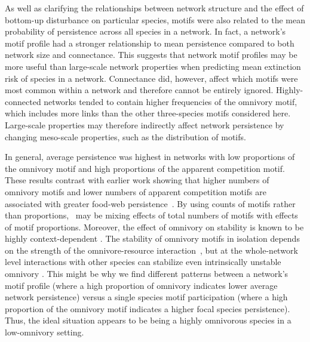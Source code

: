 \documentclass[12pt]{article}
\begin{document}
\begin{spacing}{2.0}
    As well as clarifying the relationships between network structure and the effect of bottom-up disturbance on particular species, motifs were also related to the mean probability of persistence across all species in a network.
    In fact, a network's motif profile had a stronger relationship to mean persistence compared to both network size and connectance. 
    This suggests that network motif profiles may be more useful than large-scale network properties when predicting mean extinction risk of species in a network.
    Connectance did, however, affect which motifs were most common within a network and therefore cannot be entirely ignored. 
    Highly-connected networks tended to contain higher frequencies of the omnivory motif, which includes more links than the other three-species motifs considered here.
    Large-scale properties may therefore indirectly affect network persistence by changing meso-scale properties, such as the distribution of motifs. 
    
    
    In general, average persistence was highest in networks with low proportions of the omnivory motif and high proportions of the apparent competition motif. 
    These results contrast with earlier work showing that higher numbers of omnivory motifs and lower numbers of apparent competition motifs are associated with greater food-web persistence~\citep{Stouffer2010b}.
    By using counts of motifs rather than proportions,~\citet{Stouffer2010b} may be mixing effects of total numbers of motifs with effects of motif proportions.
    Moreover, the effect of omnivory on stability is known to be highly context-dependent \citep{bascompte2005simple, Monteiro2016,McLeod2021}. 
    The stability of omnivory motifs in isolation depends on the strength of the omnivore-resource interaction~\citep{McLeod2021}, but at the whole-network level interactions with other species can stabilize even intrinsically unstable omnivory \citep{Kratina2012}. 
    This might be why we find different patterns between a network's motif profile (where a high proportion of omnivory indicates lower average network persistence) versus a single species motif participation (where a high proportion of the omnivory motif indicates a higher focal species persistence).
    Thus, the ideal situation appears to be being a highly omnivorous species in a low-omnivory setting. 
    

\end{spacing}
\end{document}
